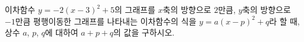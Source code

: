 이차함수 $y=-2(x-3)^2+5$의 그래프를 $x$축의 방향으로 $2$만큼, $y$축의 방향으로 $-1$만큼 평행이동한 그래프를 나타내는 이차함수의 식을 $y=a(x-p)^2+q$라 할 때, 상수 $a$, $p$, $q$에 대하여 $a+p+q$의 값을 구하시오.
